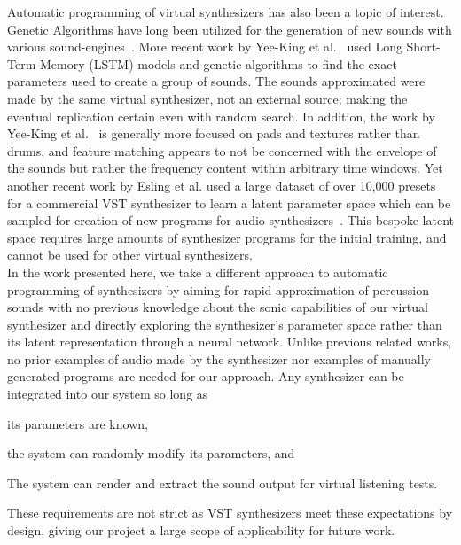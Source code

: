 \documentclass[\main/thesis.tex]{subfiles}
\begin{document}
Automatic programming of virtual synthesizers has also been a topic of interest. Genetic Algorithms have long been utilized for the generation of new sounds with various sound-engines~\cite{johnson1999exploring,dahlstedt2001creating,hornermachinetongues,macret2012automatic}. More recent work by Yee-King et al.~\cite{yee2018automatic} used Long Short-Term Memory (LSTM) models and genetic algorithms to find the exact parameters used to create a group of sounds. The sounds approximated were made by the same virtual synthesizer, not an external source; making the eventual replication certain even with random search. In addition, the work by Yee-King et al.~\cite{yee2018automatic} is generally more focused on pads and textures rather than drums, and feature matching appears to not be concerned with the envelope of the sounds but rather the frequency content within arbitrary time windows. Yet another recent work by Esling et al. used a large dataset of over 10,000 presets for a commercial VST synthesizer to learn a latent parameter space which can be sampled for creation of new programs for audio synthesizers~\cite{esling2019universal}. This bespoke latent space requires large amounts of synthesizer programs for the initial training, and cannot be used for other virtual synthesizers.\\
In the work presented here, we take a different approach to automatic programming of synthesizers by aiming for rapid approximation of percussion sounds with no previous knowledge about the sonic capabilities of our virtual synthesizer and directly exploring the synthesizer's parameter space rather than its latent representation through a neural network. Unlike previous related works, no prior examples of audio made by the synthesizer nor examples of manually generated programs are needed for our approach. Any synthesizer can be integrated into our system so long as \begin {enumerate*} [label=\itshape\alph*\upshape)]
  \item its parameters are known,
  \item the system can randomly modify its parameters, and
  \item The system can render and extract the sound output for virtual listening tests.
\end{enumerate*}  
These requirements are not strict as VST synthesizers meet these expectations by design, giving our project a large scope of applicability for future work.
\end{document}
